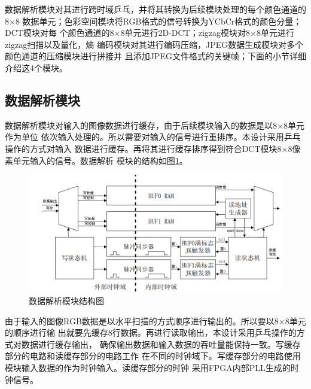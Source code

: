 \documentclass{article}
\numberwithin {equation}{section}
\begin{document}
\begin{spacing}{1.25}
    数据解析模块对其进行跨时域乒乓，并将其转换为后续模块处理的每个颜色通道的8×8
    数据单元；色彩空间模块将RGB格式的信号转换为YCbCr格式的颜色分量；DCT模块对每
    个颜色通道的8×8单元进行2D-DCT；zigzag模块对8×8单元进行zigzag扫描以及量化，熵
    编码模块对其进行编码压缩，JPEG数据生成模块对多个颜色通道的压缩模块进行拼接并
    且添加JPEG文件格式的关键帧；下面的小节详细介绍这4个模块。
  \subsection{数据解析模块}
    \vspace{1em}
    数据解析模块对输入的图像数据进行缓存，由于后续模块输入的数据是以8×8单元作为单位
    依次输入处理的。所以需要对输入的信号进行重排序。本设计采用乒乓操作的方式对输入
    数据进行缓存。再将其进行缓存排序得到符合DCT模块8×8像素单元输入的信号。数据解析
    模块的结构如图\ref{data parser}。
    \begin{figure}[H]
      \centering
      \includegraphics[scale=0.35]{./pictures/数据解析模块.png}
      \caption{数据解析模块结构图}
      \label{data parser}
    \end{figure}

    由于输入的图像RGB数据是以水平扫描的方式顺序进行输出的。所以要以8×8单元的顺序进行输
    出就要先缓存8行数据。再进行读取输出，本设计采用乒乓操作的方式对数据进行缓存输出，
    确保输出数据和输入数据的吞吐量能保持一致。写缓存部分的电路和读缓存部分的电路工作
    在不同的时钟域下。写缓存部分的电路使用模块输入数据的作为时钟输入。读缓存部分的时钟
    采用FPGA内部PLL生成的时钟信号。


\end{spacing}
\end{document}
